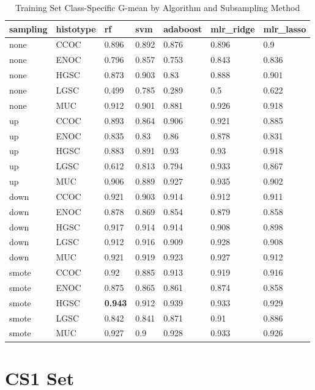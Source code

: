\documentclass[
]{report}
\begin{document}
\begin{table}

\caption{\label{tab:train-gmean-class-table}Training Set Class-Specific G-mean by Algorithm and Subsampling Method}
\centering
\begin{tabular}[t]{l|l|l|l|l|l|l}
\hline
sampling & histotype & rf & svm & adaboost & mlr\_ridge & mlr\_lasso\\
\hline
none & CCOC & 0.896 & 0.892 & 0.876 & 0.896 & 0.9\\
\hline
none & ENOC & 0.796 & 0.857 & 0.753 & 0.843 & 0.836\\
\hline
none & HGSC & 0.873 & 0.903 & 0.83 & 0.888 & 0.901\\
\hline
none & LGSC & 0.499 & 0.785 & 0.289 & 0.5 & 0.622\\
\hline
none & MUC & 0.912 & 0.901 & 0.881 & 0.926 & 0.918\\
\hline
up & CCOC & 0.893 & 0.864 & 0.906 & 0.921 & 0.885\\
\hline
up & ENOC & 0.835 & 0.83 & 0.86 & 0.878 & 0.831\\
\hline
up & HGSC & 0.883 & 0.891 & 0.93 & 0.93 & 0.918\\
\hline
up & LGSC & 0.612 & 0.813 & 0.794 & 0.933 & 0.867\\
\hline
up & MUC & 0.906 & 0.889 & 0.927 & 0.935 & 0.902\\
\hline
down & CCOC & 0.921 & 0.903 & 0.914 & 0.912 & 0.911\\
\hline
down & ENOC & 0.878 & 0.869 & 0.854 & 0.879 & 0.858\\
\hline
down & HGSC & 0.917 & 0.914 & 0.914 & 0.908 & 0.898\\
\hline
down & LGSC & 0.912 & 0.916 & 0.909 & 0.928 & 0.908\\
\hline
down & MUC & 0.921 & 0.919 & 0.923 & 0.927 & 0.912\\
\hline
smote & CCOC & 0.92 & 0.885 & 0.913 & 0.919 & 0.916\\
\hline
smote & ENOC & 0.875 & 0.865 & 0.861 & 0.874 & 0.858\\
\hline
smote & HGSC & \textbf{0.943} & 0.912 & 0.939 & 0.933 & 0.929\\
\hline
smote & LGSC & 0.842 & 0.841 & 0.871 & 0.91 & 0.886\\
\hline
smote & MUC & 0.927 & 0.9 & 0.928 & 0.933 & 0.926\\
\hline
\end{tabular}
\end{table}

\hypertarget{cs1-set}{%
\section{CS1 Set}\label{cs1-set}}
\end{document}
